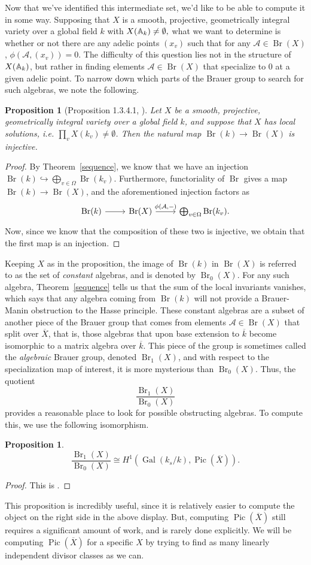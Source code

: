 \documentclass[12pt,twoside]{reedthesis}
\theoremstyle{plain}
\newtheorem{proposition}[theorem]{Proposition}
\theoremstyle{definition}
\theoremstyle{remark}
\newcommand{\Affine}{\mathbb{A}}
\newcommand{\calA}{\mathcal{A}}
\newcommand{\Br}{\operatorname{Br}}
\newcommand{\Pic}{\operatorname{Pic}}
\newcommand{\adele}{\reflectbox{$\Affine$}}
\newcommand{\Gal}{\operatorname{Gal}}
\begin{document}
Now that we've identified this intermediate set, we'd like to be able to compute it in some way. Supposing that $X$ is a smooth, projective, geometrically integral variety over a global field $k$ with $X(\adele_k)\neq\emptyset,$ what we want to determine is whether or not there are any adelic points $(x_v)$ such that for any $\calA\in\Br(X)$, $\phi(\calA,(x_v))=0$. The difficulty of this question lies not in the structure of $X(\adele_k)$, but rather in finding elements $\calA\in\Br(X)$ that specialize to 0 at a given adelic point. To narrow down which parts of the Brauer group to search for such algebras, we note the following.
\begin{proposition}[Proposition 1.3.4.1, \cite{corn}]
Let $X$ be a smooth, projective, geometrically integral variety over a global field $k$, and suppose that $X$ has local solutions, i.e. $\prod_v X(k_v)\neq\emptyset$. Then the natural map $\Br(k)\to\Br(X)$ is injective.
\end{proposition}
\begin{proof}
By Theorem~\ref{sequence}, we know that we have an injection $\Br(k)\hookrightarrow\bigoplus_{v\in\Omega}\Br(k_v)$. Furthermore, functoriality of $\Br$ gives a map $\Br(k)\to\Br(X)$, and the aforementioned injection factors as
\[ 
\begin{tikzcd}
\Br(k)\ar{r}&\Br(X)\ar{r}{\phi(\calA,-)}&\bigoplus_{v\in\Omega}\Br(k_v).
\end{tikzcd}
\]
Now, since we know that the composition of these two is injective, we obtain that the first map is an injection.
\end{proof}
\noindent Keeping $X$ as in the proposition, the image of $\Br(k)$ in $\Br(X)$ is referred to as the set of \emph{constant} algebras, and is denoted by $\Br_0(X)$. For any such algebra, Theorem~\ref{sequence} tells us that the sum of the local invariants vanishes, which says that any algebra coming from $\Br(k)$ will not provide a Brauer-Manin obstruction to the Hasse principle. These constant algebras are a subset of another piece of the Brauer group that comes from elements $\calA\in\Br(X)$ that split over $\overline{X}$, that is, those algebras that upon base extension to $\overline{k}$ become isomorphic to a matrix algebra over $\overline{k}$. This piece of the group is sometimes called the \emph{algebraic} Brauer group, denoted $\Br_1(X)$, and with respect to the specialization map of interest, it is more mysterious than $\Br_0(X)$. Thus, the quotient \[\frac{\Br_1(X)}{\Br_0(X)}\] provides a reasonable place to look for possible obstructing algebras. To compute this, we use the following isomorphism.
\begin{proposition}
\[
\frac{\Br_1(X)}{\Br_0(X)}\cong H^1(\Gal(k_s/k),\Pic(\overline{X})).
\]
\end{proposition}
\begin{proof}
This is \cite[Proposition 1.3.7]{corn}.
\end{proof}
\noindent This proposition is incredibly useful, since it is relatively easier to compute the object on the right side in the above display. But, computing $\Pic(\overline{X})$ still requires a significant amount of work, and is rarely done explicitly. We will be computing $\Pic(\overline{X})$ for a specific $X$ by trying to find as many linearly independent divisor classes as we can.
\end{document}
